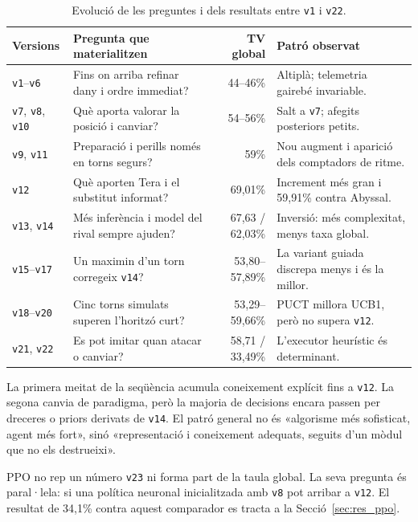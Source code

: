 \begin{table}[htbp]
\centering
\caption{Evolució de les preguntes i dels resultats entre \texttt{v1} i \texttt{v22}.}
\label{tab:version_timeline}
\small
\begin{tabularx}{\textwidth}{lXrX}
\toprule
\textbf{Versions} & \textbf{Pregunta que materialitzen} & \textbf{TV global} & \textbf{Patró observat} \\
\midrule
\texttt{v1}--\texttt{v6} & Fins on arriba refinar dany i ordre immediat? & 44--46\% & Altiplà; telemetria gairebé invariable. \\
\texttt{v7}, \texttt{v8}, \texttt{v10} & Què aporta valorar la posició i canviar? & 54--56\% & Salt a \texttt{v7}; afegits posteriors petits. \\
\texttt{v9}, \texttt{v11} & Preparació i perills només en torns segurs? & 59\% & Nou augment i aparició dels comptadors de ritme. \\
\texttt{v12} & Què aporten Tera i el substitut informat? & 69,01\% & Increment més gran i 59,91\% contra Abyssal. \\
\texttt{v13}, \texttt{v14} & Més inferència i model del rival sempre ajuden? & 67,63 / 62,03\% & Inversió: més complexitat, menys taxa global. \\
\texttt{v15}--\texttt{v17} & Un maximin d'un torn corregeix \texttt{v14}? & 53,80--57,89\% & La variant guiada discrepa menys i és la millor. \\
\texttt{v18}--\texttt{v20} & Cinc torns simulats superen l'horitzó curt? & 53,29--59,66\% & PUCT millora UCB1, però no supera \texttt{v12}. \\
\texttt{v21}, \texttt{v22} & Es pot imitar quan atacar o canviar? & 58,71 / 33,49\% & L'executor heurístic és determinant. \\
\bottomrule
\end{tabularx}
\end{table}

La primera meitat de la seqüència acumula coneixement explícit fins a \texttt{v12}. La segona canvia de paradigma, però la majoria de decisions encara passen per dreceres o priors derivats de \texttt{v14}. El patró general no és «algorisme més sofisticat, agent més fort», sinó «representació i coneixement adequats, seguits d'un mòdul que no els destrueixi».

PPO no rep un número \texttt{v23} ni forma part de la taula global. La seva pregunta és paral·lela: si una política neuronal inicialitzada amb \texttt{v8} pot arribar a \texttt{v12}. El resultat de 34,1\% contra aquest comparador es tracta a la Secció~\ref{sec:res_ppo}.

